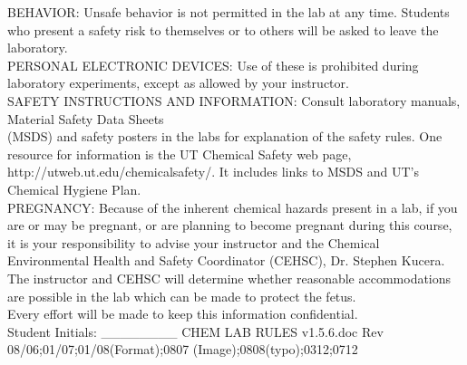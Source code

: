 \documentclass[12pt]{article}
\begin{document}
\newline %
BEHAVIOR: Unsafe behavior is not permitted in the lab at any time. Students who present a safety risk to themselves or to others will be asked to leave the laboratory.\\
\newline %
PERSONAL ELECTRONIC DEVICES: Use of these is prohibited during laboratory experiments, except as allowed by your instructor.\\
\newline %
SAFETY INSTRUCTIONS AND INFORMATION: Consult laboratory manuals, Material Safety Data Sheets\\
\newline %
(MSDS) and safety posters in the labs for explanation of the safety rules. One resource for information is the UT Chemical Safety web page, http://utweb.ut.edu/chemicalsafety/. It includes links to MSDS and UT’s Chemical
Hygiene Plan.\\
\newline %
PREGNANCY: Because of the inherent chemical hazards present in a lab, if you are or may be pregnant, or are planning to become pregnant during this course, it is your responsibility to advise your instructor and the Chemical Environmental Health and Safety Coordinator (CEHSC), Dr. Stephen Kucera. The instructor and CEHSC will determine whether reasonable accommodations are possible in the lab which can be made to protect the fetus.\\
\newline %
Every effort will be made to keep this information confidential.\\
\newline %
Student Initials: \_\_\_\_\_\_\_\_
\newline %
CHEM LAB RULES v1.5.6.doc Rev 08/06;01/07;01/08(Format);0807 (Image);0808(typo);0312;0712 
\newpage
\end{document}
